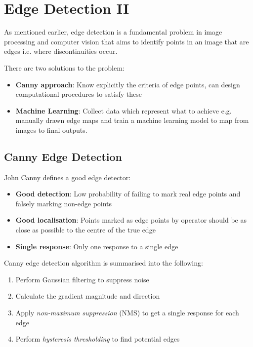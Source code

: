 \documentclass{report}
\begin{document}
\chapter{Edge Detection II}

As mentioned earlier, edge detection is a fundamental problem in image
processing and computer vision that aims to identify points in an image that are
edges i.e. where discontinuities occur. 

There are two solutions to the problem:
\begin{itemize}
    \item \textbf{Canny approach}: Know explicitly the criteria of edge points,
    can design computational procedures to satisfy these 
    \item \textbf{Machine Learning}: Collect data which represent what to achieve e.g.
    manually drawn edge maps and train a machine learning model to map from images
    to final outputs.
\end{itemize}

\section{Canny Edge Detection}

John Canny defines a good edge detector:
\begin{itemize}
    \item \textbf{Good detection}: Low probability of failing to mark real edge
    points and falsely marking non-edge points 
    \item \textbf{Good localisation}: Points marked as edge points by operator
    should be as close as possible to the centre of the true edge 
    \item \textbf{Single response}: Only one response to a single edge 
\end{itemize}

Canny edge detection algorithm is summarised into the following:
\begin{enumerate}
    \item Perform Gaussian filtering to suppress noise
    \item Calculate the gradient magnitude and direction
    \item Apply \textit{non-maximum suppression} (NMS) to get a single response for each edge
    \item Perform \textit{hysteresis thresholding} to find potential edges
\end{enumerate}
\end{document}
